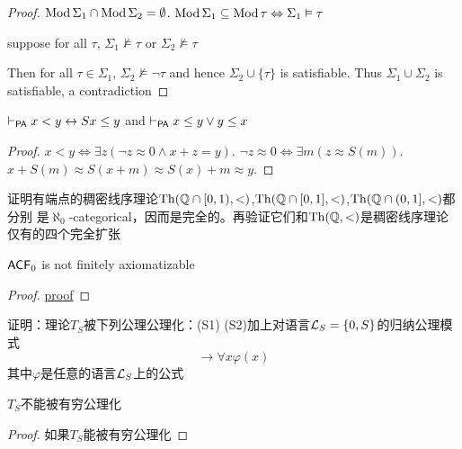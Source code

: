 \documentclass[11pt]{article}
\begin{document}
\begin{proof}
\(\operatorname{Mod}\Sigma_1\cap\operatorname{Mod}\Sigma_2=\emptyset\). \(\operatorname{Mod}\Sigma_1\subseteq\operatorname{Mod}\tau\Leftrightarrow\Sigma_1\vDash\tau\)

suppose for all \(\tau\), \(\Sigma_1\not\vDash\tau\) or \(\Sigma_2\not\vDash\tau\)

Then for all \(\tau\in\Sigma_1\), \(\Sigma_2\not\vDash\neg\tau\) and hence \(\Sigma_2\cup\{\tau\}\) is satisfiable. Thus \(\Sigma_1\cup\Sigma_2\) is
satisfiable, a contradiction
\end{proof}

\begin{exercise}
\label{8.1.2}
\(\vdash_{\operatorname{\textsf{PA}}}x<y\leftrightarrow Sx\le y\) and \(\vdash_{\operatorname{\textsf{PA}}}x\le y\vee y\le x\)
\end{exercise}

\begin{proof}
\(x<y\Leftrightarrow\exists z(\neg z\approx 0\wedge x+z=y)\).
\(\neg z\approx 0\Leftrightarrow \exists m(z\approx S(m))\).
\(x+S(m)\approx S(x+m)\approx S(x)+m\approx y\).
\end{proof}

\begin{exercise}
\label{8.2.3}
证明有端点的稠密线序理论\(\operatorname{Th}(\mathbb{Q}\cap[0,1),<)\),\(\operatorname{Th}(\mathbb{Q}\cap[0,1],<)\),\(\operatorname{Th}(\mathbb{Q}\cap(0,1],<)\)都分别
是\(\aleph_0\)-categorical，因而是完全的。再验证它们和\(\operatorname{Th}(\mathbb{Q},<)\)是稠密线序理论仅有的四个完全扩张
\end{exercise}

\begin{exercise}
\label{8.2.4}
\(\textsf{ACF}_0\) is not finitely axiomatizable
\end{exercise}

\begin{proof}
\href{https://math.stackexchange.com/questions/3453682/fields-with-characteristic-0-are-not-finitely-axiomatizable-in-fopc}{proof}
\end{proof}

\begin{exercise}
\label{8.3.2}
证明：理论\(T_S\)被下列公理公理化：(S1) (S2)加上对语言\(\mathcal{L}_S=\{0,S\}\)的归纳公理模式
\begin{equation*}
[\varphi(0)\wedge\forall x(\varphi(x)\to\varphi(Sx))]\to\forall x\varphi(x)
\end{equation*}
其中\(\varphi\)是任意的语言\(\mathcal{L}_S\)上的公式
\end{exercise}

\begin{exercise}
\label{8.3.3}
\(T_S\)不能被有穷公理化
\end{exercise}

\begin{proof}
如果\(T_S\)能被有穷公理化
\end{proof}
\end{document}
